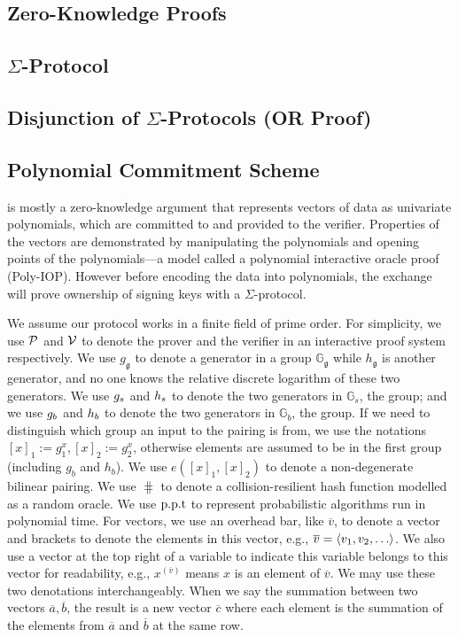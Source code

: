 \subsection{Zero-Knowledge Proofs}

\subsection{$\Sigma$-Protocol}

\subsection{Disjunction of $\Sigma$-Protocols (OR Proof)}

\subsection{Polynomial Commitment Scheme}

\Sys is mostly a zero-knowledge argument that represents vectors of data as univariate polynomials, which are committed to and provided to the verifier. Properties of the vectors are demonstrated by manipulating the polynomials and opening points of the polynomials---a model called a polynomial interactive oracle proof (Poly-IOP). However before encoding the data into polynomials, the exchange will prove ownership of signing keys with a $\Sigma$-protocol.

We assume our protocol works in a finite field of prime order. For simplicity, we use $\mathcal{P}$ and $\mathcal{V}$ to denote the prover and the verifier in an interactive proof system respectively. We use $g_\mathfrak{g}$ to denote a generator in a group $\mathbb{G}_\mathfrak{g}$ while $h_\mathfrak{g}$ is another generator, and no one knows the relative discrete logarithm of these two generators. We use $g_s$ and $h_s$ to denote the two generators in $\mathbb{G}_s$, the \secp group; and we use $g_b$ and $h_b$ to denote the two generators in $\mathbb{G}_b$, the \bls group. If we need to distinguish which group an input to the pairing is from, we use the notations $[x]_1:=g_1^x,[x]_2:=g_2^x$, otherwise elements are  assumed to be in the first group (including $g_b$ and $h_b$). We use $e([x]_1,[x]_2)$ to denote a non-degenerate bilinear pairing. We use $\hash$ to denote a collision-resilient hash function modelled as a random oracle. We use $\text{p.p.t}$ to represent probabilistic algorithms run in polynomial time.  For vectors, we use an overhead bar, like $\overline{v}$, to denote a vector and brackets to denote the elements in this vector, e.g., $\overline{v}=\tuple{v_1,v_2,\dots}$. We also use a vector at the top right of a variable to indicate this variable belongs to this vector for readability, e.g., $x^{(\overline{v})}$ means $x$ is an element of $\overline{v}$. We may use these two denotations interchangeably. When we say the summation between two vectors $\overline{a},\overline{b}$, the result is a new vector $\overline{c}$ where each element is the summation of the elements from $\overline{a}$ and $\overline{b}$ at the same row.

